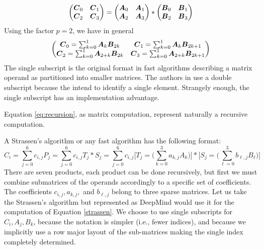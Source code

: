 \documentclass[acmsmall]{acmart}
\begin{document}
\begin{equation}
  \label{basic}
  \begin{pmatrix}
    {\boldsymbol C}_0 & {\boldsymbol C}_1 \\
    {\boldsymbol C}_2 & {\boldsymbol C}_3 \\
  \end{pmatrix} =
  \begin{pmatrix}
    {\boldsymbol A}_0 & {\boldsymbol A}_1 \\
    {\boldsymbol A}_2 & {\boldsymbol A}_3 \\
  \end{pmatrix} *
  \begin{pmatrix}
    {\boldsymbol B}_0 & {\boldsymbol B}_1 \\
    {\boldsymbol B}_2 & {\boldsymbol B}_3 \\
  \end{pmatrix} 
\end{equation}
Using the factor $p=2$, we have in general
\begin{equation}
  \label{eq:recursion}
  \begin{pmatrix} 
    {\boldsymbol C}_0 = \sum_{k=0}^{1}{\boldsymbol A}_k    {\boldsymbol B}_{2k} &
    {\boldsymbol C}_1 = \sum_{k=0}^{1}{\boldsymbol A}_k    {\boldsymbol B}_{2k+1} \\
    {\boldsymbol C}_2 = \sum_{k=0}^{1}{\boldsymbol A}_{2+k} {\boldsymbol B}_{2k} &
    {\boldsymbol C}_3 = \sum_{k=0}^{1}{\boldsymbol A}_{2+k} {\boldsymbol B}_{2k+1} \\
  \end{pmatrix}
\end{equation}
The single subscript is the original format in fast algorithms
describing a matrix operand as partitioned into smaller matrices. The
authors in \cite{PMID:36198780} use a double subscript because the
intend to identify a single element. Strangely enough, the single
subscript has an implementation advantage.

Equation \ref{eq:recursion}, as matrix computation, represent naturally
a recursive computation.

A Strassen's algorithm or any fast algorithm has the following format:
\begin{equation}
  \label{strassen}
C_i = \sum_{j=0}^6 c_{i,j}P_j =\sum_{j=0}^6 c_{i,j}T_j*S_j  
=\sum_{j=0}^6 c_{i,j}\Big[ T_j = \big(\sum_{k=0}^3
  a_{k,j}A_k\big)\Big]* \Big[S_j = \big(\sum_{\ell=0}^3 b_{\ell,j}B_\ell\big) \Big]
\end{equation}
There are seven products, each product can be done recursively, but
first we must combine submatrices of the operands accordingly to a
specific set of coefficients. The coefficients $c_{i,j},a_{k,j},$ and
$b_{\ell,j}$ belong to three sparse matrices. Let us take the
Strassen's algorithm but represented as DeepMind would use it for the
computation of Equation \ref{strassen}. We choose to use single
subscripts for $C_i, A_j, B_k$, because the notation is simpler (i.e.,
fewer indices), and because we implicitly use a row major layout of
the sub-matrices making the single index completely determined.
\end{document}
